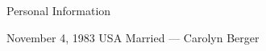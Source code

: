 \begin{rubric}{Personal Information}

   November 4, 1983
  \entry*[Citizenship] USA
   Married --- Carolyn Berger

\end{rubric}